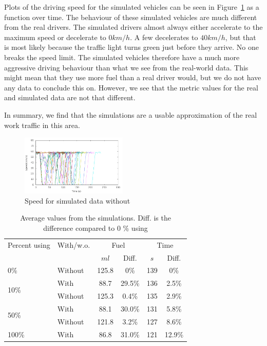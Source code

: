 Plots of the driving speed for the simulated vehicles can be seen in Figure~\ref{fig:TestResults:speed0} as a function over time.
The behaviour of these simulated vehicles are much different from the real drivers.
The simulated drivers almost always either accelerate to the maximum speed or decelerate to $0 km/h$. 
A few decelerates to $40 km/h$, but that is most likely because the traffic light turns green just before they arrive.
No one breaks the speed limit.
The simulated vehicles therefore have a much more aggressive driving behaviour than what we see from the real-world data.
This might mean that they use more fuel than a real driver would, but we do not have any data to conclude this on. 
However, we see that the metric values for the real and simulated data are not that different.

In summary, we find that the simulations are a usable approximation of the real work traffic in this area.

\begin{figure}[htb]
\includegraphics[width=0.45\textwidth]{../images/tp0c0_8/speedUncontrolled0.png}
\caption{Speed for simulated data without \tech}
\label{fig:TestResults:speed0}
\end{figure}

\begin{table}
\centering
\begin{tabular}{|l|l|cc|cc|}\hline
Percent using 			& With/w.o. & \multicolumn{2}{c|}{Fuel} 	& \multicolumn{2}{c|}{Time}\\
\tech					&\tech		& $ml$		& Diff.			&	$s$	& Diff.\\\hline
\multirow{1}{*}{0\%}	& Without	&	125.8	&	0\%			&	139 & 0\%		\\\hline
\multirow{2}{*}{10\%}	& With 		&	88.7	&	29.5\%		&	136 & 2.5\%		\\
						& Without 	&	125.3	&	0.4\%		&	135 & 2.9\%		\\\hline
\multirow{2}{*}{50\%}	& With		&	88.1	&	30.0\%		&	131 & 5.8\%		\\
						& Without	&	121.8	&	3.2\%		&	127 & 8.6\%		\\\hline
\multirow{1}{*}{100\%}	& With		&	86.8	&	31.0\%		&	121 & 12.9\%	\\\hline
\end{tabular}
\caption{Average values from the simulations. Diff. is the difference compared to 0 \% using \tech}
\label{tb:TestResults:total}
\end{table}


